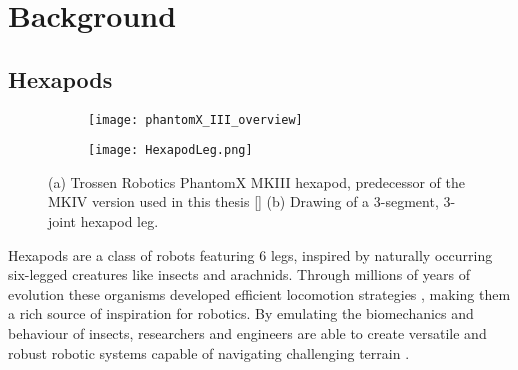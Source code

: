 \chapter{Background}
\label{ch:background}


\section{Hexapods} \label{sec: Hexapods}

\begin{figure}[!h]
	\begin{subfigure}{.5\textwidth} %
		\centering
		\texttt{[image: phantomX\_III\_overview]}  %
		\caption{}
		\label{figure: PhantomX MKIII}
	\end{subfigure}
	\begin{subfigure}{.5\textwidth}
		\centering
		\texttt{[image: HexapodLeg.png]}  
		\caption{}
		\label{figure: Hexapod Leg Sketch}
	\end{subfigure}
	\caption[Hexapod and hexapod leg]{(a) Trossen Robotics PhantomX MKIII hexapod, predecessor of the MKIV version used in this thesis [\cite{PhantomX_MKIII}] (b) Drawing of a 3-segment, 3-joint hexapod leg.}
	\label{figure: Hexapod and hexapod leg}
\end{figure}

Hexapods are a class of robots featuring 6 legs, inspired by naturally occurring six-legged creatures like insects and arachnids.
Through millions of years of evolution these organisms developed efficient locomotion strategies \parencite{neville2006bipedal}, making them a rich source of inspiration for robotics.
By emulating the biomechanics and behaviour of insects, researchers and engineers are able to create versatile and robust robotic systems capable of navigating challenging terrain \parencite{irawan2011optimal, ouyang2021adaptive, schilling2013walknet}.

